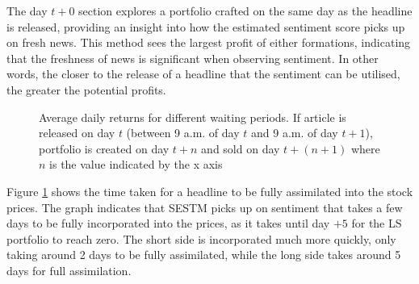 The day $t + 0$ section explores a portfolio crafted on the same day as the headline is released, providing an insight into how the estimated sentiment score picks up on fresh news. This method sees the largest profit of either formations, indicating that the freshness of news is significant when observing sentiment. In other words, the closer to the release of a headline that the sentiment can be utilised, the greater the potential profits.
\begin{figure}[!ht]
      \centering
{}
\caption[Graph of average daily returns for different waiting periods]{Average daily returns for different waiting periods. If article is released on day $t$ (between 9 a.m. of day $t$ and 9 a.m. of day $t+1$), portfolio is created on day $t+n$ and sold on day $t+(n+1)$ where $n$ is the value indicated by the x axis}
\label{fig:speed-assimilation}
\end{figure}

Figure \ref{fig:speed-assimilation} shows the time taken for a headline to be fully assimilated into the stock prices. The graph indicates that SESTM picks up on sentiment that takes a few days to be fully incorporated into the prices, as it takes until day $+ 5$ for the LS portfolio to reach zero. The short side is incorporated much more quickly, only taking around 2 days to be fully assimilated, while the long side takes around 5 days for full assimilation. 


